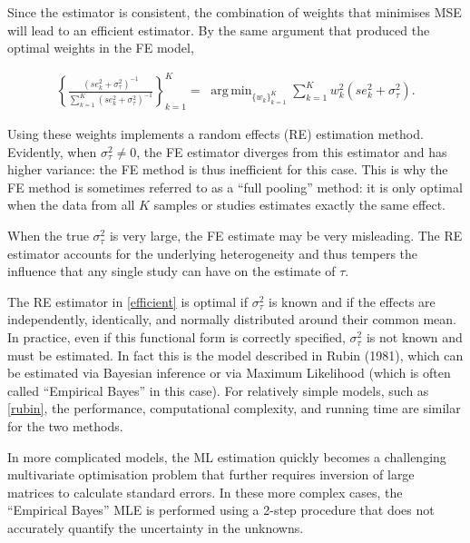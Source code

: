 \documentclass[12pt]{article}
\DeclareMathOperator*{\argmin}{arg\,min}
\begin{document}
Since the estimator is consistent, the combination of weights that minimises MSE will lead to an efficient estimator. By the same argument that produced the optimal weights in the FE model, 

 \begin{equation}\label{efficient}
\begin{aligned}
\left\{ \frac{(se^2_k+ \sigma^2_{\tau})^{-1}}{\sum_{k=1}^K(se^2_k+ \sigma^2_{\tau})^{-1}} \right\}_{k=1}^K = \; \argmin_{ \{w_k\}_{k=1}^K  } \sum_{k=1}^{K} w_k^2 (se^2_{k}+ \sigma^2_{\tau}).
\end{aligned}
\end{equation}

Using these weights implements a random effects (RE) estimation method. Evidently, when $\sigma^2_{\tau} \neq 0$, the FE estimator diverges from this estimator and has higher variance: the FE method is thus inefficient for this case. This is why the FE method is sometimes referred to as a ``full pooling'' method: it is only optimal when the data from all $K$ samples or studies estimates exactly the same effect. 

When the true $\sigma^2_{\tau}$ is very large, the FE estimate may be very misleading. 
The RE estimator accounts for the underlying heterogeneity and thus tempers the influence that any single study can have on the estimate of $\tau$.

The RE estimator in \eqref{efficient} is optimal if $\sigma^2_{\tau}$ is known and if the effects are independently, identically, and normally distributed around their common mean. 
In practice, even if this functional form is correctly specified, $\sigma^2_{\tau}$ is not known and must be estimated. In fact this is the model described in Rubin (1981), which can be estimated via Bayesian inference or via Maximum Likelihood (which is often called ``Empirical Bayes'' in this case). For relatively simple models, such as \eqref{rubin}, the performance, computational complexity, and running time are similar for the two methods. 

In more complicated models, the ML estimation quickly becomes a challenging multivariate optimisation problem that further requires inversion of large matrices to calculate standard errors. In these more complex cases, the ``Empirical Bayes'' MLE is performed using a 2-step procedure that does not accurately quantify the uncertainty in the unknowns. 
\end{document}

